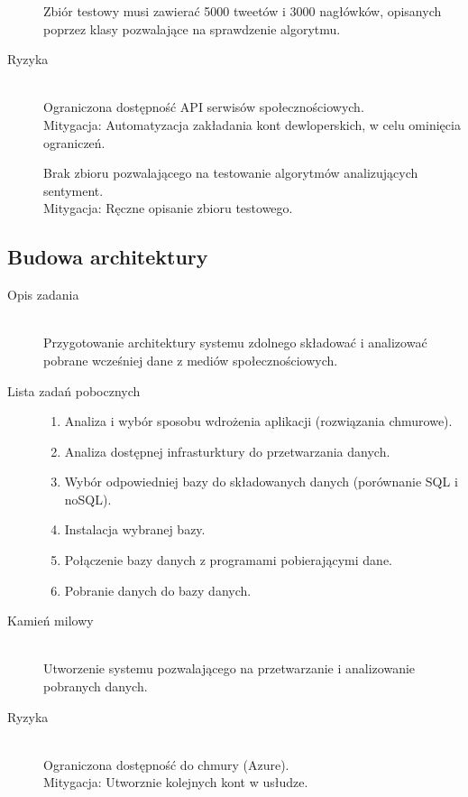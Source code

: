 \documentclass[a4paper,11pt, notitlepage ]{article}
\begin{document}
\begin{description}
        Zbiór testowy musi zawierać 5000 tweetów i 3000 nagłówków, opisanych poprzez klasy pozwalające na sprawdzenie algorytmu.

        \item[Ryzyka] \hfill \\ 
        Ograniczona dostępność API serwisów społecznościowych.\\
        Mitygacja: Automatyzacja zakładania kont dewloperskich, w celu ominięcia ograniczeń.

        Brak zbioru pozwalającego na testowanie algorytmów analizujących sentyment.\\
        Mitygacja: Ręczne opisanie zbioru testowego.
    \end{description}

\subsection{Budowa architektury}
    \begin{description}
        \item[Opis zadania] \hfill \\ Przygotowanie architektury systemu zdolnego składować i analizować pobrane wcześniej dane z mediów społecznościowych.
         
        \item[Lista zadań pobocznych] \hfill 
        \begin{enumerate}
            \item Analiza i wybór sposobu wdrożenia aplikacji (rozwiązania chmurowe).
            \item Analiza dostępnej infrasturktury do przetwarzania danych.
            \item Wybór odpowiedniej bazy do składowanych danych (porównanie SQL i noSQL).
            \item Instalacja wybranej bazy.
            \item Połączenie bazy danych z programami pobierającymi dane.
            \item Pobranie danych do bazy danych.
        \end{enumerate}

        \item[Kamień milowy] \hfill \\
        Utworzenie systemu pozwalającego na przetwarzanie i analizowanie pobranych danych.


        \item[Ryzyka] \hfill \\ 
        Ograniczona dostępność do chmury (Azure).\\
        Mitygacja: Utworznie kolejnych kont w usłudze.
    \end{description}
   
\end{document}
